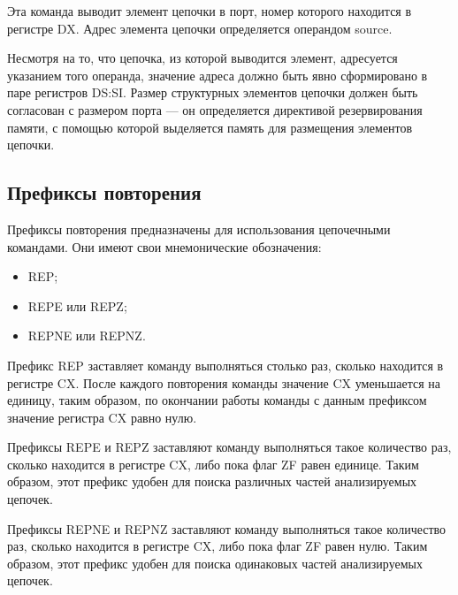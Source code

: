 Эта команда выводит элемент цепочки в порт, номер которого находится в регистре DX.
Адрес элемента цепочки определяется операндом source.

Несмотря на то, что цепочка, из которой выводится элемент, адресуется указанием
того операнда, значение адреса должно быть явно сформировано в паре регистров
DS:SI. Размер структурных элементов цепочки должен быть согласован
с размером порта --- он определяется директивой резервирования памяти, 
с помощью которой выделяется память для размещения элементов цепочки.

\subsection{Префиксы повторения}

Префиксы повторения предназначены для использования цепочечными командами.
Они имеют свои мнемонические обозначения:
\begin{itemize}
\item REP;
\item REPE или REPZ;
\item REPNE или REPNZ.
\end{itemize}

Префикс REP заставляет команду выполняться столько раз, сколько находится 
в регистре CX. После каждого повторения команды значение CX уменьшается на единицу, таким
образом, по окончании работы команды с данным префиксом значение регистра CX равно нулю.

Префиксы REPE и REPZ заставляют команду выполняться такое количество раз, сколько находится 
в регистре CX, либо пока флаг ZF равен единице. Таким образом, этот префикс удобен для поиска 
различных частей анализируемых цепочек.

Префиксы REPNE и REPNZ заставляют команду выполняться такое количество раз, сколько находится 
в регистре CX, либо пока флаг ZF равен нулю. Таким образом, этот префикс удобен для поиска 
одинаковых частей анализируемых цепочек.